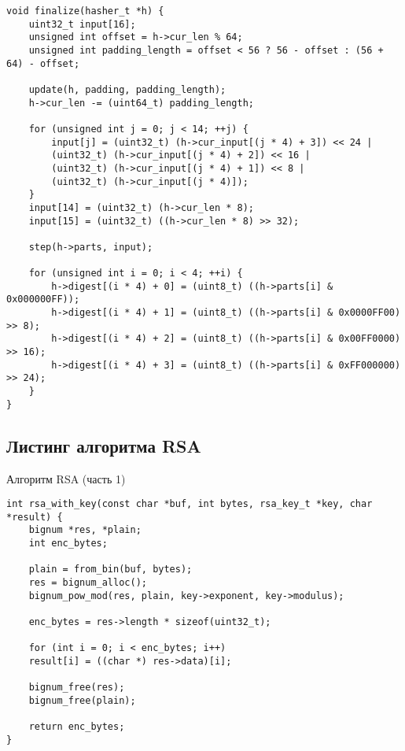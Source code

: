 \begin{listing}[!h]
\begin{verbatim}
void finalize(hasher_t *h) {
	uint32_t input[16];
	unsigned int offset = h->cur_len % 64;
	unsigned int padding_length = offset < 56 ? 56 - offset : (56 + 64) - offset;
	
	update(h, padding, padding_length);
	h->cur_len -= (uint64_t) padding_length;
	
	for (unsigned int j = 0; j < 14; ++j) {
		input[j] = (uint32_t) (h->cur_input[(j * 4) + 3]) << 24 |
		(uint32_t) (h->cur_input[(j * 4) + 2]) << 16 |
		(uint32_t) (h->cur_input[(j * 4) + 1]) << 8 |
		(uint32_t) (h->cur_input[(j * 4)]);
	}
	input[14] = (uint32_t) (h->cur_len * 8);
	input[15] = (uint32_t) ((h->cur_len * 8) >> 32);
	
	step(h->parts, input);
	
	for (unsigned int i = 0; i < 4; ++i) {
		h->digest[(i * 4) + 0] = (uint8_t) ((h->parts[i] & 0x000000FF));
		h->digest[(i * 4) + 1] = (uint8_t) ((h->parts[i] & 0x0000FF00) >> 8);
		h->digest[(i * 4) + 2] = (uint8_t) ((h->parts[i] & 0x00FF0000) >> 16);
		h->digest[(i * 4) + 3] = (uint8_t) ((h->parts[i] & 0xFF000000) >> 24);
	}
}
	\end{verbatim}
\end{listing}


\subsection{Листинг алгоритма RSA}

\begin{listing}[!h]
	\caption{Алгоритм RSA (часть 1)}
	\begin{verbatim}
int rsa_with_key(const char *buf, int bytes, rsa_key_t *key, char *result) {
	bignum *res, *plain;
	int enc_bytes;
	
	plain = from_bin(buf, bytes);
	res = bignum_alloc();
	bignum_pow_mod(res, plain, key->exponent, key->modulus);
	
	enc_bytes = res->length * sizeof(uint32_t);
	
	for (int i = 0; i < enc_bytes; i++)
	result[i] = ((char *) res->data)[i];
	
	bignum_free(res);
	bignum_free(plain);
	
	return enc_bytes;
}
	\end{verbatim}
\end{listing}

